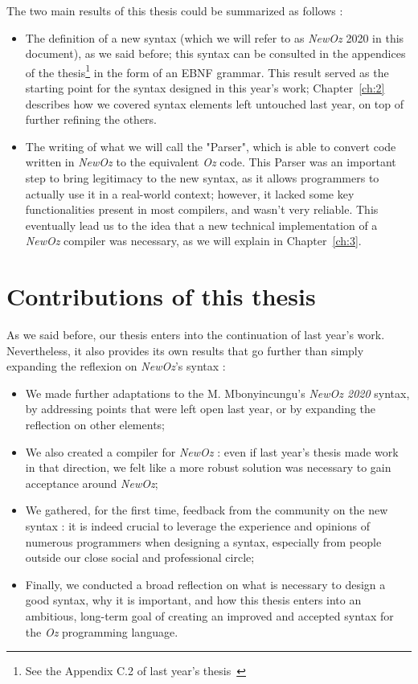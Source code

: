 The two main results of this thesis could be summarized as follows :
\begin{itemize}
    \item The definition of a new syntax (which we will refer to as \textit{NewOz} 2020 in this document), as we said before;
    this syntax can be consulted in the appendices of the thesis\footnote{See the Appendix C.2 of last year's thesis~\cite{jpthesis}} in the form of an EBNF grammar.
    This result served as the starting point for the syntax designed in this year's work;
    Chapter~\ref{ch:2} describes how we covered syntax elements left untouched last year, on top of further refining the others.
    \item The writing of what we will call the "Parser", which is able to convert code written in \textit{NewOz} to the equivalent \textit{Oz} code.
    This Parser was an important step to bring legitimacy to the new syntax, as it allows programmers to actually use it in a real-world context;
    however, it lacked some key functionalities present in most compilers, and wasn't very reliable.
    This eventually lead us to the idea that a new technical implementation of a \textit{NewOz} compiler was necessary, as we will explain in Chapter~\ref{ch:3}.
\end{itemize}

\section{Contributions of this thesis}\label{sec:ch1-3}
As we said before, our thesis enters into the continuation of last year's work.
Nevertheless, it also provides its own results that go further than simply expanding the reflexion on \textit{NewOz}'s syntax :
\begin{itemize}
    \item We made further adaptations to the M. Mbonyincungu's \textit{NewOz 2020} syntax, by addressing points that were left open last year, or by expanding the reflection on other elements;
    \item We also created a compiler for \textit{NewOz} : even if last year's thesis made work in that direction, we felt like a more robust solution was necessary to gain acceptance around \textit{NewOz};
    \item We gathered, for the first time, feedback from the community on the new syntax : it is indeed crucial to leverage the experience and opinions of numerous programmers when designing a syntax, especially from people outside our close social and professional circle;
    \item Finally, we conducted a broad reflection on what is necessary to design a good syntax, why it is important, and how this thesis enters into an ambitious, long-term goal of creating an improved and accepted syntax for the \textit{Oz} programming language.
\end{itemize}

